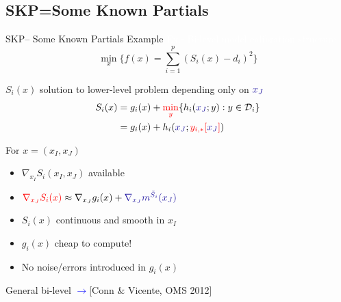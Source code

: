 \documentclass[handout,aspectratio=54]{beamer}
\numberwithin{theorem}{section}
\begin{document}
\subsection{SKP=Some Known Partials}
\begin{frame}{SKP– Some Known Partials Example}
\colorbox[rgb]{0.5,0.6,0.7}{\textcolor{white}{Ex.- Bi-level model calibration structure}}
\begin{equation*}
\min_x\{f(x)=\sum_{i=1}^p(S_i(x)-d_i)^2\}
\end{equation*}

$S_i(x)$ solution to lower-level problem depending only on $\textcolor{blue}{x_J}$
\begin{align*}
S_i(x)&=g_i(x)+\textcolor{red}{\min_y}\{h_i(\textcolor{blue}{x_J};y):y\in\mathcal{D}_i\}\\
&=g_i(x)+h_i(\textcolor{blue}{x_J};\textcolor{red}{y_{i,*}[}\textcolor{blue}{x_J}\textcolor{red}{]})
\end{align*}

For $x=(x_I,x_J)$
\begin{itemize}
\item $\nabla_{x_I}S_i(x_I,x_J)$ available
\item $\textcolor{red}{\nabla_{x_J}S_i(x)}\approx\nabla_{x_J}g_i(x)+\textcolor{blue}{\nabla_{x_J}m^{\tilde{S}_i}(x_J)}$
\item $S_i(x)$ continuous and smooth in $x_I$
\item $g_i(x)$ cheap to compute!
\item No noise/errors introduced in $g_i(x)$
\end{itemize}

\flushright\footnotesize
General bi-level  \textcolor{blue}{$\rightarrow$}\textcolor[RGB]{128,0,128}{[Conn \& Vicente, OMS 2012]}
\end{frame}
\end{document}
